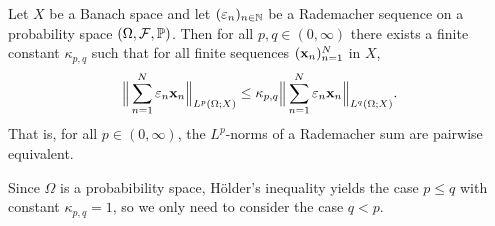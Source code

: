 \begin{thm}\label{thm:kk}
  Let $X$ be a Banach space and let $(\varepsilon_{n})_{n \in \mathbb{N}}$ be a Rademacher sequence on a probability space $(\Omega,\mathcal{F},\mathbb{P})$.
  Then for all $p,q \in (0,\infty)$ there exists a finite constant $\kappa_{p,q}$ such that for all finite sequences $(\mathbf{x}_n)_{n=1}^N$ in $X$,
  \begin{equation*}
    \Big\|\sum_{n=1}^{N} \varepsilon_{n} \mathbf{x}_{n} \Big\|_{L^p(\Omega;X)} \leq \kappa_{p,q} \Big\|\sum_{n=1}^{N} \varepsilon_{n} \mathbf{x}_{n} \Big\|_{L^q(\Omega;X)}.
  \end{equation*}
  That is, for all $p \in (0,\infty)$, the $L^p$-norms of a Rademacher sum are pairwise equivalent.  
\end{thm}

Since $\Omega$ is a probabibility space, H\"older's inequality yields the case $p \leq q$ with constant $\kappa_{p,q} = 1$, so we only need to consider the case $q < p$.

